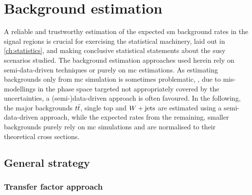 

\chapter{Background estimation}\label{ch:background_estimation}

\graphicspath{{chapter-background/Figs/Vector/}{chapter-background/Figs/}}


A reliable and trustworthy estimation of the expected \gls{sm} background rates in the signal regions is crucial for exercising the statistical machinery, laid out in \cref{ch:statistics}, and making conclusive statistical statements about the \gls{susy} scenarios studied.
The background estimation approaches used herein rely on semi-data-driven techniques or purely on \gls{mc} estimations.
As estimating backgrounds only from \gls{mc} simulation is sometimes problematic, \eg, due to mis-modellings in the phase space targeted not appropriately covered by the uncertainties, a (semi-)data-driven approach is often favoured.
In the following, the major backgrounds $t\bar{t}$, single top and $W+\mathrm{jets}$ are estimated using a semi-data-driven approach, while the expected rates from the remaining, smaller backgrounds purely rely on \gls{mc} simulations and are normalised to their theoretical cross sections.

\section{General strategy}

\subsection{Transfer factor approach}

